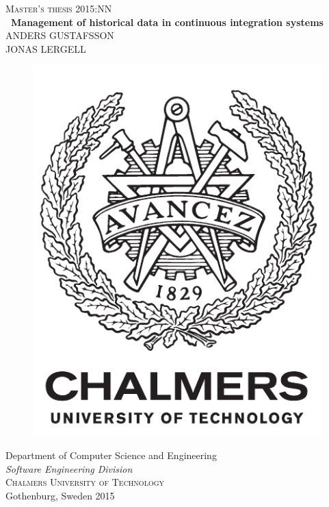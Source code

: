 \newpage
\thispagestyle{empty}
\begin{center}
	\textsc{\large Master's thesis 2015:NN}\\[4cm]
	\textbf{\ Management of historical data in continuous integration systems } \\[1cm]
	{\large ANDERS GUSTAFSSON}\\[0.3cm]
	{\large JONAS LERGELL}
	
	\vfill	
	\begin{figure}[h!]
	\centering
	\includegraphics[width=0.2\pdfpagewidth]{figure/auxiliary/logo_eng.pdf} \\	
	\end{figure}	\vspace{5mm}	
	
    Department of Computer Science and Engineering\\
	\emph{Software Engineering Division}\\
	\textsc{Chalmers University of Technology} \\
	Gothenburg, Sweden 2015 \\
\end{center}


